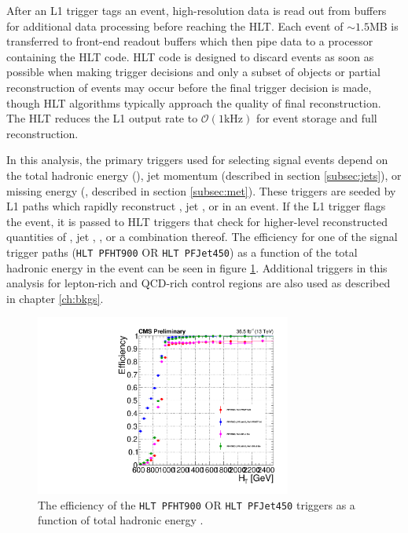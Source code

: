 After an L1 trigger tags an event, high-resolution data is read out from buffers for additional data processing before reaching the HLT. Each event of $\sim1.5$MB is transferred to front-end readout buffers which then pipe data to a processor containing the HLT code. HLT code is designed to discard events as soon as possible when making trigger decisions and only a subset of objects or partial reconstruction of events may occur before the final trigger decision is made, though HLT algorithms typically approach the quality of final reconstruction. The HLT reduces the L1 output rate to $\mathcal{O}(1\text{kHz})$ for event storage and full reconstruction.

In this analysis, the primary triggers used for selecting signal events depend on the total hadronic energy (\HT), jet momentum (described in section \ref{subsec:jets}), or missing energy (\MET, described in section \ref{subsec:met}). These triggers are seeded by L1 paths which rapidly reconstruct \HT, jet \pt, or \MET in an event. If the L1 trigger flags the event, it is passed to HLT triggers that check for higher-level reconstructed quantities of  \HT, jet \pt,  \MET, or a combination thereof. The efficiency for one of the signal trigger paths (\texttt{HLT PFHT900} OR \texttt{HLT PFJet450}) as a function of the total hadronic energy in the event can be seen in figure \ref{fig:triggerTurnon}. Additional triggers in this analysis for lepton-rich and QCD-rich control regions are also used as described in chapter \ref{ch:bkgs}.

 \begin{figure}
	\centering
	\includegraphics[width=0.75\textwidth]{detector/figs/trigeff_PFHT900_PFJet450_36p5fb}
	\renewcommand{\baselinestretch}{1.0}
	\caption[The efficiency of the \texttt{HLT PFHT900} OR \texttt{HLT PFJet450} triggers as a function of total hadronic energy \HT.]{The efficiency of the \texttt{HLT PFHT900} OR \texttt{HLT PFJet450} triggers as a function of total hadronic energy \HT.}
	\label{fig:triggerTurnon}
\end{figure}

